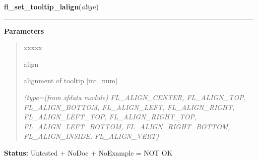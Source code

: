     \label{xformslib:library:fl_set_tooltip_lalign}

    \vspace{0.5ex}

\hspace{.8\funcindent}\begin{boxedminipage}{\funcwidth}

    \raggedright \textbf{fl\_set\_tooltip\_lalign}(\textit{align})

    \vspace{-1.5ex}

    \rule{\textwidth}{0.5\fboxrule}
\setlength{\parskip}{2ex}
\setlength{\parskip}{1ex}
      \textbf{Parameters}
      \vspace{-1ex}

      \begin{quote}
        \begin{Ventry}{xxxxx}

          \item[align]

          alignment of tooltip [int\_num]

            {\it (type=(from xfdata module) FL\_ALIGN\_CENTER, FL\_ALIGN\_TOP, FL\_ALIGN\_BOTTOM, 
FL\_ALIGN\_LEFT, FL\_ALIGN\_RIGHT, FL\_ALIGN\_LEFT\_TOP, 
FL\_ALIGN\_RIGHT\_TOP, FL\_ALIGN\_LEFT\_BOTTOM, FL\_ALIGN\_RIGHT\_BOTTOM, 
FL\_ALIGN\_INSIDE, FL\_ALIGN\_VERT)}

        \end{Ventry}

      \end{quote}

\textbf{Status:} Untested + NoDoc + NoExample = NOT OK



    \end{boxedminipage}

    \label{xformslib:library:fl_exe_command}

    \vspace{0.5ex}

